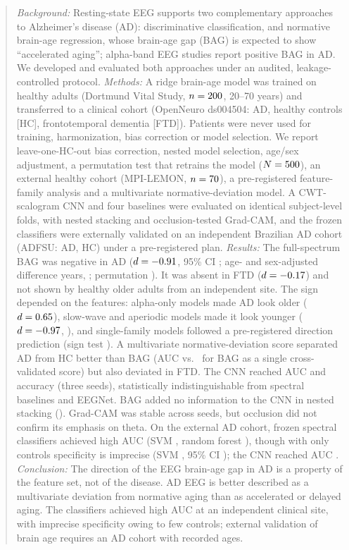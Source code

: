\documentclass[journal]{IEEEtran}
\begin{document}
\begin{abstract}
\emph{Background:} Resting-state EEG supports two complementary approaches to Alzheimer's disease (AD): discriminative classification, and normative brain-age regression, whose brain-age gap (BAG) is expected to show ``accelerated aging''; alpha-band EEG studies report positive BAG in AD. We developed and evaluated both approaches under an audited, leakage-controlled protocol.
\emph{Methods:} A ridge brain-age model was trained on healthy adults (Dortmund Vital Study, $n=\nDort{}$, 20--70 years) and transferred to a clinical cohort (OpenNeuro ds004504: \nAD{} AD, \nHC{} healthy controls [HC], \nFTD{} frontotemporal dementia [FTD]). Patients were never used for training, harmonization, bias correction or model selection. We report leave-one-HC-out bias correction, nested model selection, age/sex adjustment, a permutation test that retrains the model ($N=\bagPermN{}$), an external healthy cohort (MPI-LEMON, $n=\nLemon{}$), a pre-registered feature-family analysis and a multivariate normative-deviation model. A CWT-scalogram CNN and four baselines were evaluated on identical subject-level folds, with nested stacking and occlusion-tested Grad-CAM, and the frozen classifiers were externally validated on an independent Brazilian AD cohort (ADFSU: \extNad{} AD, \extNhc{} HC) under a pre-registered plan.
\emph{Results:} The full-spectrum BAG was negative in AD ($d=\bagD{}$, 95\% CI \bagDci{}; age- and sex-adjusted difference \adjCoef{} years, \adjP{}; permutation \bagPermP{}). It was absent in FTD ($d=\bagFTDd{}$) and not shown by healthy older adults from an independent site. The sign depended on the features: alpha-only models made AD look older ($d=\famAlphaD{}$), slow-wave and aperiodic models made it look younger ($d=\famSlowD{}$, \famAperD{}), and \famAgree{} single-family models followed a pre-registered direction prediction (sign test \famSignP{}). A multivariate normative-deviation score separated AD from HC better than BAG (AUC \normAUC{} vs.\ \bagAUC{} for BAG as a single cross-validated score) but also deviated in FTD. The CNN reached AUC \cnnAUC{} and accuracy \cnnAcc{} (three seeds), statistically indistinguishable from spectral baselines and EEGNet. BAG added no information to the CNN in nested stacking (\nestDiffP{}). Grad-CAM was stable across seeds, but occlusion did not confirm its emphasis on theta. On the external AD cohort, frozen spectral classifiers achieved high AUC (SVM \extFrozenSvmAUC{}, random forest \extFrozenRfAUC{}), though with only \extNhc{} controls specificity is imprecise (SVM \extFrozenSvmSpec{}, 95\% CI \extFrozenSvmSpecCI{}); the CNN reached AUC \extFrozenCnnAUC{}.
\emph{Conclusion:} The direction of the EEG brain-age gap in AD is a property of the feature set, not of the disease. AD EEG is better described as a multivariate deviation from normative aging than as accelerated or delayed aging. The classifiers achieved high AUC at an independent clinical site, with imprecise specificity owing to few controls; external validation of brain age requires an AD cohort with recorded ages.
\end{abstract}
\end{document}
